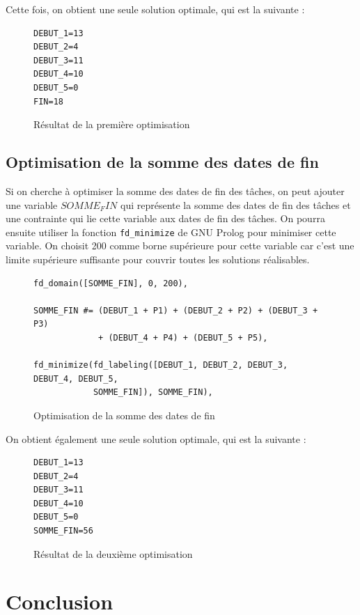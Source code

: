 \documentclass{latexPackage/utc-report/utc-report}
\begin{document}
Cette fois, on obtient une seule solution optimale, qui est la suivante :

\begin{figure}[h!]
    \begin{verbatim}
DEBUT_1=13
DEBUT_2=4
DEBUT_3=11
DEBUT_4=10
DEBUT_5=0
FIN=18
    \end{verbatim}
    \caption{Résultat de la première optimisation}
\end{figure}

\pagebreak

\subsection{Optimisation de la somme des dates de fin}

Si on cherche à optimiser la somme des dates de fin des tâches, on peut ajouter une variable $SOMME_FIN$ qui représente la somme des dates de fin des tâches et une contrainte qui lie cette variable aux dates de fin des tâches. On pourra ensuite utiliser la fonction \texttt{fd\_minimize} de GNU Prolog pour minimiser cette variable. On choisit 200 comme borne supérieure pour cette variable car c'est une limite supérieure suffisante pour couvrir toutes les solutions réalisables.

\begin{figure}[h!]
    \begin{verbatim}
fd_domain([SOMME_FIN], 0, 200),

SOMME_FIN #= (DEBUT_1 + P1) + (DEBUT_2 + P2) + (DEBUT_3 + P3)
             + (DEBUT_4 + P4) + (DEBUT_5 + P5),

fd_minimize(fd_labeling([DEBUT_1, DEBUT_2, DEBUT_3, DEBUT_4, DEBUT_5,
            SOMME_FIN]), SOMME_FIN),

    \end{verbatim}
    \caption{Optimisation de la somme des dates de fin}
\end{figure}

On obtient également une seule solution optimale, qui est la suivante :

\begin{figure}[h!]
    \begin{verbatim}
DEBUT_1=13
DEBUT_2=4
DEBUT_3=11
DEBUT_4=10
DEBUT_5=0
SOMME_FIN=56
    \end{verbatim}
    \caption{Résultat de la deuxième optimisation}
\end{figure}

\pagebreak

\section{Conclusion}
\end{document}
